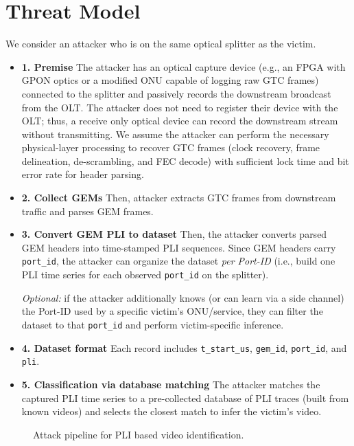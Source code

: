 \documentclass[sigconf,anonymous]{acmart}
\begin{document}
\section{Threat Model}
We consider an attacker who is on the same optical splitter as the victim.
\begin{itemize}
  \item \textbf{1. Premise} The attacker has an optical capture device (e.g., an FPGA with GPON optics or a modified ONU capable of logging raw GTC frames) connected to the splitter and passively records the downstream broadcast from the OLT.
The attacker does not need to register their device with the OLT; thus, a receive only optical device can record the downstream stream without transmitting.
We assume the attacker can perform the necessary physical-layer processing to recover GTC frames (clock recovery, frame delineation, de-scrambling, and FEC decode) with sufficient lock time and bit error rate for header parsing.
  \item \textbf{2. Collect GEMs} Then, attacker extracts GTC frames from downstream traffic and parses GEM frames. 
  \item \textbf{3. Convert GEM PLI to dataset} Then, the attacker converts parsed GEM headers into time-stamped PLI sequences.
  Since GEM headers carry \texttt{port\_id}, the attacker can organize the dataset \emph{per Port-ID} (i.e., build one PLI time series for each observed \texttt{port\_id} on the splitter).

  \emph{Optional:} if the attacker additionally knows (or can learn via a side channel) the Port-ID used by a specific victim's ONU/service, they can filter the dataset to that \texttt{port\_id} and perform victim-specific inference.
  \item \textbf{4. Dataset format} Each record includes \texttt{t\_start\_us}, \texttt{gem\_id}, \texttt{port\_id}, and \texttt{pli}.
  \item \textbf{5. Classification via database matching} The attacker matches the captured PLI time series to a pre-collected database of PLI traces (built from known videos) and selects the closest match to infer the victim’s video.
\end{itemize}
\begin{figure}[h]
  \centering
  \vspace{-0.2em}
  
  \caption{Attack pipeline for PLI based video identification.}
  \label{fig:pipeline}
\end{figure}
\end{document}
